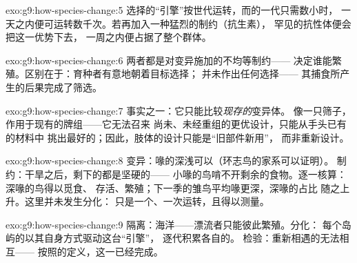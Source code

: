 \begin{solution}{exo:g9:how-species-change:5}
选择的“引擎”按世代运转，而的一代只需数小时，
一天之内便可运转数千次。若再加入一种猛烈的制约（抗生素），
罕见的抗性体便会把这一优势下去，
一周之内便占据了整个群体。
\end{solution}

\begin{solution}{exo:g9:how-species-change:6}
两者都是对变异施加的不均等制约——
决定谁能繁殖。区别在于：育种者有意地朝着目标选择；
并未作出任何选择——
其捕食所产生的后果完成了筛选。
\end{solution}

\begin{solution}{exo:g9:how-species-change:7}
事实之一：它只能比较\emph{现存的}变异体。
像一只筛子，作用于现有的牌组——它无法召来
尚未、未经重组的更优设计，只能从手头已有的材料中
挑出最好的；因此，肢体的设计只能是“旧部件新用”，
而非重新设计。
\end{solution}

\begin{solution}{exo:g9:how-species-change:8}
变异：喙的深浅可以（环志鸟的家系可以证明）。
制约：干旱之后，剩下的都是坚硬的——
小喙的鸟啃不开剩余的食物。逐一核算：深喙的鸟得以觅食、
存活、繁殖；下一季的雏鸟平均喙更深，深喙的占比
随之上升。这里并未发生分化：
只是一个、一次运转，且得以测量。
\end{solution}

\begin{solution}{exo:g9:how-species-change:9}
隔离：海洋——漂流者只能彼此繁殖。分化：
每个岛屿的以其自身方式驱动这台“引擎”，
逐代积累各自的。
检验：重新相遇的无法相互——
按照的定义，这一已经完成。
\end{solution}

